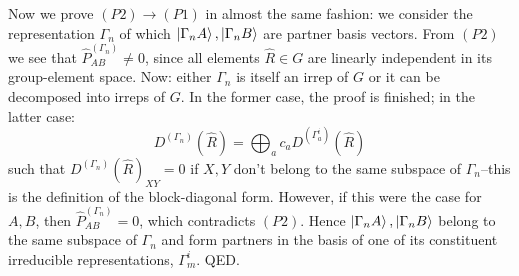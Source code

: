 \documentclass[12pt]{article}
\begin{document}
	Now we prove $(P2)\rightarrow (P1)$ in almost the same fashion: we consider the representation $\Gamma_n$ of which $\ket{\Gamma_nA}, \ket{\Gamma_nB}$ are partner basis vectors. From $(P2)$ we see that $\hat{P}^{\left(\Gamma_n\right)}_{AB}\neq 0$, since all elements $\hat{R}\in G$ are linearly independent in its group-element space. Now: either $\Gamma_n$ is itself an irrep of $G$ or it can be decomposed into irreps of $G$. In the former case, the proof is finished; in the latter case:
	$$D^{\left(\Gamma_n\right)}(\hat{R})=\bigoplus_{a}c_aD^{\left(\Gamma_a^i\right)}(\hat{R})$$
	such that $D^{\left(\Gamma_n\right)}(\hat{R})_{XY}=0$ if $X,Y$ don't belong to the same subspace of $\Gamma_n$--this is the definition of the block-diagonal form. However, if this were the case for $A,B$, then $\hat{P}^{\left(\Gamma_n\right)}_{AB}= 0$, which contradicts $(P2)$. Hence $\ket{\Gamma_nA}, \ket{\Gamma_nB}$ belong to the same subspace of $\Gamma_n$ and form partners in the basis of one of its constituent irreducible representations, $\Gamma_m^i$. QED.
	
	
\end{document}
